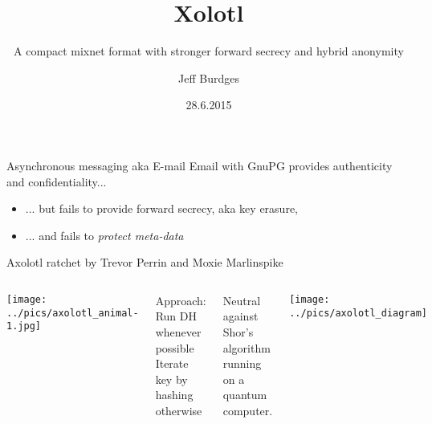 \documentclass[fleqn,xcolor={usenames,dvipsnames}]{beamer}
\title{Xolotl}
\subtitle{A compact mixnet format with stronger forward secrecy and hybrid anonymity}
\author[Burdges]{Jeff Burdges}
\institute{
  \texttt{[image: ../logos/gnunet-logo.pdf]}

  \vfill
  \texttt{[image: ../logos/inria.pdf]}
}
\date{28.6.2015}
\begin{document}
{
\begin{frame}
\titlepage
\end{frame}
}
\setcounter{framenumber}{0}



\begin{frame}{Asynchronous messaging aka E-mail}
Email with GnuPG provides authenticity and confidentiality...
  \begin{itemize}
  \item ... but fails to provide forward secrecy, aka key erasure,
  \item ... and fails to {\em protect meta-data}
  \end{itemize} 
\end{frame}





\begin{frame}{Axolotl ratchet by Trevor Perrin and Moxie Marlinspike}
\begin{columns}[T]
\texttt{[image: ../pics/axolotl\_animal-1.jpg]}

Approach: \\
\hspace*{2pt} Run DH whenever possible \\
\hspace*{2pt} Iterate key by hashing otherwise 

\bigskip
Neutral against Shor's algorithm \\
 \hspace*{2pt} running on a quantum computer. 

\texttt{[image: ../pics/axolotl\_diagram]}
\end{columns}
\end{frame}
\end{document}

